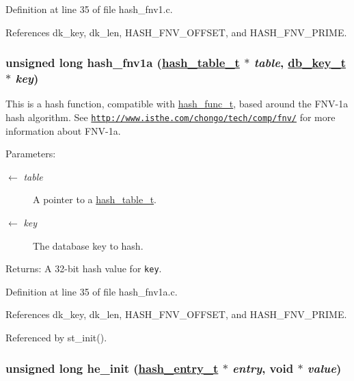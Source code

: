 Definition at line 35 of file hash\_\-fnv1.c.

References dk\_\-key, dk\_\-len, HASH\_\-FNV\_\-OFFSET, and HASH\_\-FNV\_\-PRIME.\hypertarget{group__dbprim__hash_ga8}{
\subsubsection[hash\_\-fnv1a]{\setlength{\rightskip}{0pt plus 5cm}unsigned long hash\_\-fnv1a (\hyperlink{struct__hash__table__s}{hash\_\-table\_\-t} $\ast$ {\em table}, \hyperlink{struct__db__key__s}{db\_\-key\_\-t} $\ast$ {\em key})}}
\label{group__dbprim__hash_ga8}


This is a hash function, compatible with \hyperlink{group__dbprim__hash_ga4}{hash\_\-func\_\-t}, based around the FNV-1a hash algorithm. See \href{http://www.isthe.com/chongo/tech/comp/fnv/}{\tt http://www.isthe.com/chongo/tech/comp/fnv/} for more information about FNV-1a.

\begin{Desc}
\item[Parameters:]
\begin{description}
\item[\mbox{$\leftarrow$} {\em table}]A pointer to a \hyperlink{group__dbprim__hash_ga1}{hash\_\-table\_\-t}. \item[\mbox{$\leftarrow$} {\em key}]The database key to hash.\end{description}
\end{Desc}
\begin{Desc}
\item[Returns:]A 32-bit hash value for {\tt key}.\end{Desc}


Definition at line 35 of file hash\_\-fnv1a.c.

References dk\_\-key, dk\_\-len, HASH\_\-FNV\_\-OFFSET, and HASH\_\-FNV\_\-PRIME.

Referenced by st\_\-init().\hypertarget{group__dbprim__hash_ga19}{
\subsubsection[he\_\-init]{\setlength{\rightskip}{0pt plus 5cm}unsigned long he\_\-init (\hyperlink{struct__hash__entry__s}{hash\_\-entry\_\-t} $\ast$ {\em entry}, void $\ast$ {\em value})}}
\label{group__dbprim__hash_ga19}


